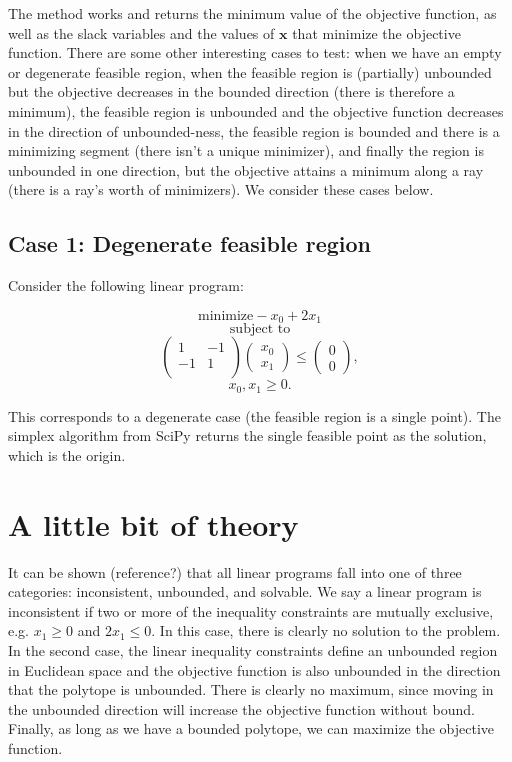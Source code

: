 \documentclass[12pt,english]{article}
\begin{document}
The method works and returns the minimum value of the objective function, as well as the slack variables and the values of $\mathbf{x}$ that minimize the objective function.  There are some other interesting cases to test: when we have an empty or degenerate feasible region, when the feasible region is (partially) unbounded but the objective decreases in the bounded direction (there is therefore a minimum), the feasible region is unbounded and the objective function decreases in the direction of unbounded-ness, the feasible region is bounded and there is a minimizing segment (there isn't a unique minimizer), and finally the region is unbounded in one direction, but the objective attains a minimum along a ray (there is a ray's worth of minimizers).  We consider these cases below.

\subsection*{Case 1: Degenerate feasible region}

Consider the following linear program:

$$
\text{minimize} -x_0 + 2x_1
$$
$$
\text{subject to}
$$
$$
\left(
\begin{array}{cc}
1	&	-1 	\\
-1 	&	1     	\\
\end{array}
\right)
\left(
\begin{array}{c}
x_0 \\
x_1
\end{array}
\right)
\leq
\left(
\begin{array}{c}
0 \\
0
\end{array}
\right),
$$
$$
x_0, x_1 \geq 0.
$$

This corresponds to a degenerate case (the feasible region is a single point).  The simplex algorithm from SciPy returns the single feasible point as the solution, which is the origin.


\section{A little bit of theory}

It can be shown (reference?) that all linear programs fall into one of three categories: inconsistent, unbounded, and solvable.  We say a linear program is inconsistent if two or more of the inequality constraints are mutually exclusive, e.g. $x_1 \geq 0$ and $2 x_1 \leq 0$.  In this case, there is clearly no solution to the problem.   In the second case, the linear inequality constraints define an unbounded region in Euclidean space and the objective function is also unbounded in the direction that the polytope is unbounded.  There is clearly no maximum, since moving in the unbounded direction will increase the objective function without bound.  Finally, as long as we have a bounded polytope, we can maximize the objective function. \\
\end{document}
